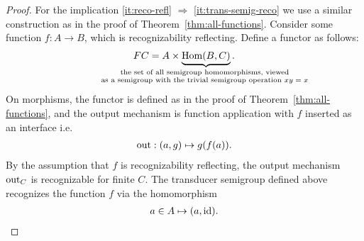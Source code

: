 \begin{proof}
    For the implication \ref{it:reco-refl} $\Rightarrow$ \ref{it:trans-semig-reco} we  use a similar construction as in the proof of Theorem~\ref{thm:all-functions}.
    Consider some function $f : A \to B$, which is recognizability reflecting. Define  a functor as follows:
    \begin{align*}
    \functor C = A \times \myunderbrace{\mathrm{Hom}(B,C)}{the set of all  semigroup  homomorphisms, viewed \\ as a semigroup 
    with the trivial semigroup operation $xy = x$}.
    \end{align*}
    On morphisms, the functor is defined as in the proof of Theorem~\ref{thm:all-functions}, and the output mechanism  is function application with $f$ inserted as an interface i.e.
    \begin{align*}
        \mathrm{out} : (a,g) \mapsto g(f(a)).
    \end{align*}
    By the assumption that $f$ is recognizability reflecting, the output mechanism $\mathrm{out}_C$ is recognizable for finite $C$.
    The transducer semigroup defined above recognizes the function $f$ via the homomorphism 
    \begin{align*}
    a \in A  \mapsto  (a,\mathrm{id}).
    \end{align*} 
    

\end{proof}
